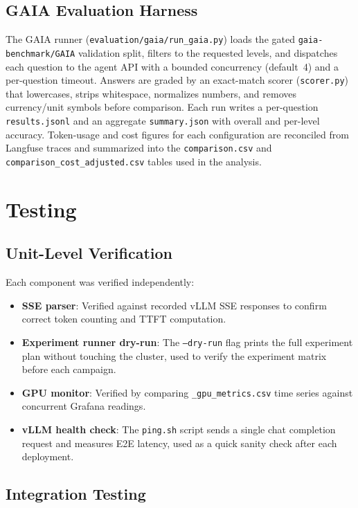 \documentclass[a4paper,12pt]{report}
\begin{document}
\subsection{GAIA Evaluation Harness}

The GAIA runner (\texttt{evaluation/gaia/run\_gaia.py}) loads the gated \texttt{gaia-benchmark/GAIA} validation split, filters to the requested levels, and dispatches each question to the agent API with a bounded concurrency (default~4) and a per-question timeout. Answers are graded by an exact-match scorer (\texttt{scorer.py}) that lowercases, strips whitespace, normalizes numbers, and removes currency/unit symbols before comparison. Each run writes a per-question \texttt{results.jsonl} and an aggregate \texttt{summary.json} with overall and per-level accuracy. Token-usage and cost figures for each configuration are reconciled from Langfuse traces and summarized into the \texttt{comparison.csv} and \texttt{comparison\_cost\_adjusted.csv} tables used in the analysis.

\section{Testing}

\subsection{Unit-Level Verification}

Each component was verified independently:

\begin{itemize}
    \item \textbf{SSE parser}: Verified against recorded vLLM SSE responses to confirm correct token counting and TTFT computation.
    \item \textbf{Experiment runner dry-run}: The \texttt{--dry-run} flag prints the full experiment plan without touching the cluster, used to verify the experiment matrix before each campaign.
    \item \textbf{GPU monitor}: Verified by comparing \texttt{\_gpu\_metrics.csv} time series against concurrent Grafana readings.
    \item \textbf{vLLM health check}: The \texttt{ping.sh} script sends a single chat completion request and measures E2E latency, used as a quick sanity check after each deployment.
\end{itemize}

\subsection{Integration Testing}
\end{document}
